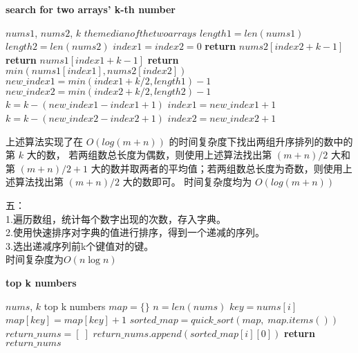 \documentclass{article}
\begin{document}
\begin{algorithm}
    \caption{\textbf{search for two arrays' k-th number}}
    \label{alg:arrays_k-th}
    \begin{algorithmic}[1]
        \REQUIRE $nums1$, $nums2$, $k$
        \ENSURE $the median of the two arrays$
        \STATE $length1 = len(nums1)$
        \STATE $length2 = len(nums2)$
        \STATE $index1 = index2 = 0$
        \STATE \textbf{return} $nums2[index2 + k - 1]$
        \ENDIF
        \STATE \textbf{return} $nums1[index1 + k - 1]$
        \ENDIF
        \STATE \textbf{return} $min(nums1[index1], nums2[index2])$
        \ENDIF
        \STATE $new\_index1 = min(index1 + k / 2, length1) - 1$
        \STATE $new\_index2 = min(index2 + k / 2, length2) - 1$
        \STATE $k = k - (new\_index1 - index1 + 1)$
        \STATE $index1 = new\_index1 + 1$
        \ELSE
        \STATE $k = k - (new\_index2 - index2 + 1)$
        \STATE $index2 = new\_index2 + 1$
        \ENDIF
        \ENDWHILE
    \end{algorithmic}
\end{algorithm}

上述算法实现了在 $O(log(m + n))$ 的时间复杂度下找出两组升序排列的数中的第 $k$ 大的数，
若两组数总长度为偶数，则使用上述算法找出第 $(m + n) / 2$ 大和第 $(m + n) / 2 + 1$ 
大的数并取两者的平均值；若两组数总长度为奇数，则使用上述算法找出第 $(m + n) / 2$ 大的数即可。
时间复杂度均为 $O(log(m + n))$ 


\newpage
五：
\\
1.遍历数组，统计每个数字出现的次数，存入字典。
\\
2.使用快速排序对字典的值进行排序，得到一个递减的序列。
\\
3.选出递减序列前k个键值对的键。
\\
时间复杂度为$O(n \log n)$

\begin{algorithm}
    \caption{\textbf{top k numbers}}
    \label{alg:top_k}
    \begin{algorithmic}[1]
        \REQUIRE $nums$, $k$
        \ENSURE top k numbers
        \STATE $map = \{\}$
        \STATE $n = len(nums)$
        \STATE $key = nums[i]$
        \STATE $map[key] = map[key] + 1$
        \ENDFOR
        \STATE $sorted\_map = quick\_sort(map,\; map.items())$
        \STATE $return\_nums = [\;]$
        \STATE $return\_nums.append(sorted\_map[i][0])$
        \ENDIF
        \ENDFOR
        \STATE \textbf{return} $return\_nums$
    \end{algorithmic}
\end{algorithm}
\end{document}

